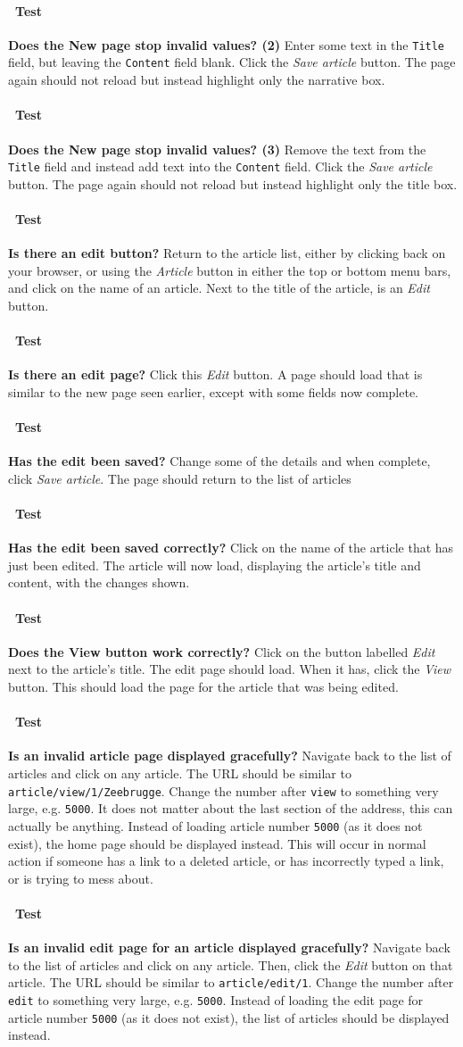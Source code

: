 \documentclass[12pt]{article}
\newcounter{Test}
\newcommand{\test}[1]{%
\stepcounter{Test}%
\paragraph{\Circle\ Test \theTest} \textbf{#1} }
\begin{document}
\test{Does the New page stop invalid values? (2)}
Enter some text in the \texttt{Title} field, but leaving the \texttt{Content} field blank. Click the \textit{Save article} button. The page again should not reload but instead highlight only the narrative box.

\test{Does the New page stop invalid values? (3)}
Remove the text from the \texttt{Title} field and instead add text into the \texttt{Content} field. Click the \textit{Save article} button. The page again should not reload but instead highlight only the title box.

\test{Is there an edit button?}
Return to the article list, either by clicking back on your browser, or using the \textit{Article} button in either the top or bottom menu bars, and click on the name of an article. Next to the title of the article, is an \textit{Edit} button.

\test{Is there an edit page?}
Click this \textit{Edit} button. A page should load that is similar to the new page seen earlier, except with some fields now complete.

\test{Has the edit been saved?}
Change some of the details and when complete, click \textit{Save article}. The page should return to the list of articles

\test{Has the edit been saved correctly?}
Click on the name of the article that has just been edited. The article will now load, displaying the article's title and content, with the changes shown.

\test{Does the View button work correctly?}
Click on the button labelled \textit{Edit} next to the article's title. The edit page should load. When it has, click the \textit{View} button. This should load the page for the article that was being edited.

\test{Is an invalid article page displayed gracefully?}
Navigate back to the list of articles and click on any article. The URL should be similar to \texttt{article/view/1/Zeebrugge}. Change the number after \texttt{view} to something very large, e.g. \texttt{5000}. It does not matter about the last section of the address, this can actually be anything. Instead of loading article number \texttt{5000} (as it does not exist), the home page should be displayed instead. This will occur in normal action if someone has a link to a deleted article, or has incorrectly typed a link, or is trying to mess about.

\test{Is an invalid edit page for an article displayed gracefully?}
Navigate back to the list of articles and click on any article. Then, click the \textit{Edit} button on that article. The URL should be similar to \texttt{article/edit/1}. Change the number after \texttt{edit} to something very large, e.g. \texttt{5000}. Instead of loading the edit page for article number \texttt{5000} (as it does not exist), the list of articles should be displayed instead.
\end{document}
